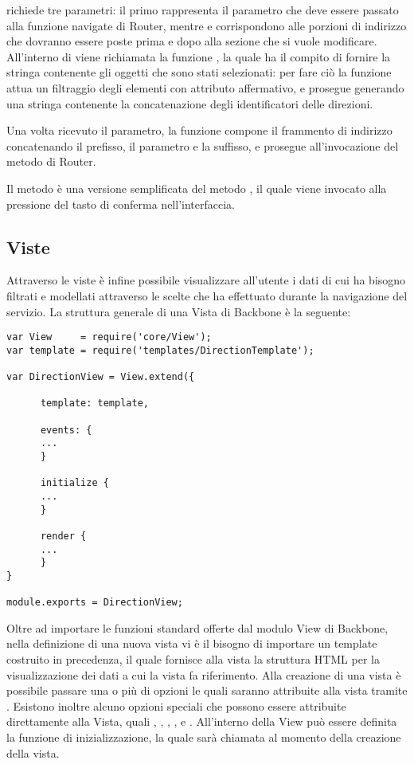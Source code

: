   richiede tre parametri: il primo rappresenta il parametro  che deve essere passato alla funzione navigate di Router, mentre  e  corrispondono alle porzioni di indirizzo che dovranno essere poste prima e dopo alla sezione che si vuole modificare.
 All'interno di  viene richiamata la funzione , la quale ha il compito di fornire la stringa contenente gli oggetti che sono stati selezionati: per fare ciò la funzione attua un filtraggio degli elementi con attributo  affermativo, e prosegue generando una stringa contenente la concatenazione degli identificatori delle direzioni.

 Una volta ricevuto il parametro, la funzione  compone il frammento di indirizzo concatenando il prefisso, il parametro e la suffisso, e prosegue all'invocazione del metodo  di Router.

 Il metodo  è una versione semplificata del metodo , il quale viene invocato alla pressione del tasto di conferma nell'interfaccia. 

\subsection{Viste} %
\label{sub:viste}

Attraverso le viste è infine possibile visualizzare all'utente i dati di cui ha bisogno filtrati e modellati attraverso le scelte che ha effettuato durante la navigazione del servizio.
La struttura generale di una Vista di Backbone è la seguente:

\begin{lstlisting}
var View     = require('core/View');
var template = require('templates/DirectionTemplate');

var DirectionView = View.extend({
      
      template: template,

      events: {
      ...
      }

      initialize {
      ...
      }

      render {
      ...
      }
}

module.exports = DirectionView;
\end{lstlisting}


Oltre ad importare le funzioni standard offerte dal modulo View di Backbone, nella definizione di una nuova vista vi è il bisogno di importare un template costruito in precedenza, il quale fornisce alla vista la struttura HTML per la visualizzazione dei dati a cui la vista fa riferimento.
Alla creazione di una vista è possibile passare una o più di opzioni le quali saranno attribuite alla vista tramite . Esistono inoltre alcuno opzioni speciali che possono essere attribuite direttamente alla Vista, quali , , , ,   e . All'interno della View può essere definita la funzione di inizializzazione, la quale sarà chiamata al momento della creazione della vista.

